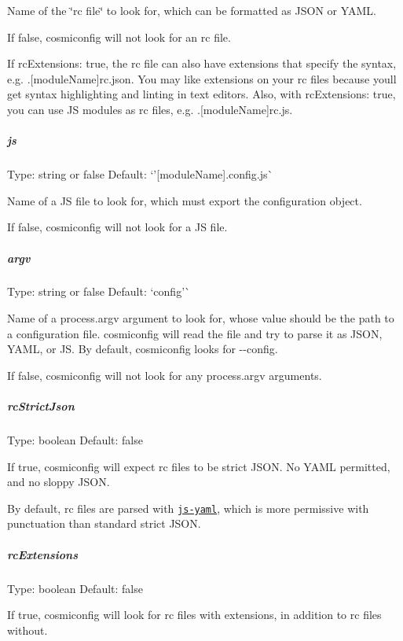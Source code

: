 Name of the \char`\"{}rc file\char`\"{} to look for, which can be formatted as J\+S\+ON or Y\+A\+ML.

If {\ttfamily false}, cosmiconfig will not look for an rc file.

If {\ttfamily rc\+Extensions\+: true}, the rc file can also have extensions that specify the syntax, e.\+g. {\ttfamily .\mbox{[}module\+Name\mbox{]}rc.\+json}. You may like extensions on your rc files because you\textquotesingle{}ll get syntax highlighting and linting in text editors. Also, with {\ttfamily rc\+Extensions\+: true}, you can use JS modules as rc files, e.\+g. {\ttfamily .\mbox{[}module\+Name\mbox{]}rc.\+js}.

\subparagraph*{js}

Type\+: {\ttfamily string} or {\ttfamily false} Default\+: `'\mbox{[}module\+Name\mbox{]}.config.\+js\textquotesingle{}\`{}

Name of a JS file to look for, which must export the configuration object.

If {\ttfamily false}, cosmiconfig will not look for a JS file.

\subparagraph*{argv}

Type\+: {\ttfamily string} or {\ttfamily false} Default\+: `\textquotesingle{}config'\`{}

Name of a {\ttfamily process.\+argv} argument to look for, whose value should be the path to a configuration file. cosmiconfig will read the file and try to parse it as J\+S\+ON, Y\+A\+ML, or JS. By default, cosmiconfig looks for {\ttfamily -\/-\/config}.

If {\ttfamily false}, cosmiconfig will not look for any {\ttfamily process.\+argv} arguments.

\subparagraph*{rc\+Strict\+Json}

Type\+: {\ttfamily boolean} Default\+: {\ttfamily false}

If {\ttfamily true}, cosmiconfig will expect rc files to be strict J\+S\+ON. No Y\+A\+ML permitted, and no sloppy J\+S\+ON.

By default, rc files are parsed with \href{https://github.com/nodeca/js-yaml}{\tt js-\/yaml}, which is more permissive with punctuation than standard strict J\+S\+ON.

\subparagraph*{rc\+Extensions}

Type\+: {\ttfamily boolean} Default\+: {\ttfamily false}

If {\ttfamily true}, cosmiconfig will look for rc files with extensions, in addition to rc files without.

